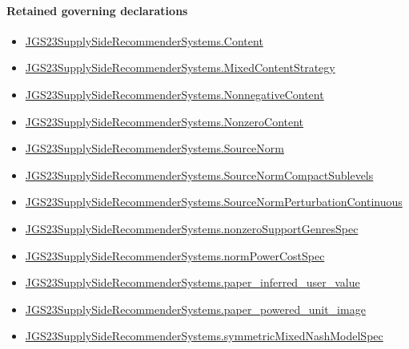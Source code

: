 \documentclass[10pt]{article}
\begin{document}
\paragraph{Retained governing declarations}
\begin{itemize}\raggedright
\item \hyperlink{governing-declaration-367305fda50f0ada}{JGS23\allowbreak{}Supply\allowbreak{}Side\allowbreak{}Recommender\allowbreak{}Systems.\allowbreak{}Content}
\item \hyperlink{governing-declaration-2089965d06cf0282}{JGS23\allowbreak{}Supply\allowbreak{}Side\allowbreak{}Recommender\allowbreak{}Systems.\allowbreak{}Mixed\allowbreak{}Content\allowbreak{}Strategy}
\item \hyperlink{governing-declaration-d426babe40b9593c}{JGS23\allowbreak{}Supply\allowbreak{}Side\allowbreak{}Recommender\allowbreak{}Systems.\allowbreak{}Nonnegative\allowbreak{}Content}
\item \hyperlink{governing-declaration-90e2ac7d13788c50}{JGS23\allowbreak{}Supply\allowbreak{}Side\allowbreak{}Recommender\allowbreak{}Systems.\allowbreak{}Nonzero\allowbreak{}Content}
\item \hyperlink{governing-declaration-6141339a5d3412d9}{JGS23\allowbreak{}Supply\allowbreak{}Side\allowbreak{}Recommender\allowbreak{}Systems.\allowbreak{}Source\allowbreak{}Norm}
\item \hyperlink{governing-declaration-0d92048317064110}{JGS23\allowbreak{}Supply\allowbreak{}Side\allowbreak{}Recommender\allowbreak{}Systems.\allowbreak{}Source\allowbreak{}Norm\allowbreak{}Compact\allowbreak{}Sublevels}
\item \hyperlink{governing-declaration-6ccc463be39b315f}{JGS23\allowbreak{}Supply\allowbreak{}Side\allowbreak{}Recommender\allowbreak{}Systems.\allowbreak{}Source\allowbreak{}Norm\allowbreak{}Perturbation\allowbreak{}Continuous}
\item \hyperlink{governing-declaration-588c7a0b2af225d7}{JGS23\allowbreak{}Supply\allowbreak{}Side\allowbreak{}Recommender\allowbreak{}Systems.\allowbreak{}nonzero\allowbreak{}Support\allowbreak{}Genres\allowbreak{}Spec}
\item \hyperlink{governing-declaration-6ba13dc1cae95e6e}{JGS23\allowbreak{}Supply\allowbreak{}Side\allowbreak{}Recommender\allowbreak{}Systems.\allowbreak{}norm\allowbreak{}Power\allowbreak{}Cost\allowbreak{}Spec}
\item \hyperlink{governing-declaration-48347eafb3702717}{JGS23\allowbreak{}Supply\allowbreak{}Side\allowbreak{}Recommender\allowbreak{}Systems.\allowbreak{}paper\_\allowbreak{}inferred\_\allowbreak{}user\_\allowbreak{}value}
\item \hyperlink{governing-declaration-41ef1ed062d142a1}{JGS23\allowbreak{}Supply\allowbreak{}Side\allowbreak{}Recommender\allowbreak{}Systems.\allowbreak{}paper\_\allowbreak{}powered\_\allowbreak{}unit\_\allowbreak{}image}
\item \hyperlink{paper-prerequisite-b412efba7deb757f}{JGS23\allowbreak{}Supply\allowbreak{}Side\allowbreak{}Recommender\allowbreak{}Systems.\allowbreak{}symmetric\allowbreak{}Mixed\allowbreak{}Nash\allowbreak{}Model\allowbreak{}Spec}
\end{itemize}
\end{document}
